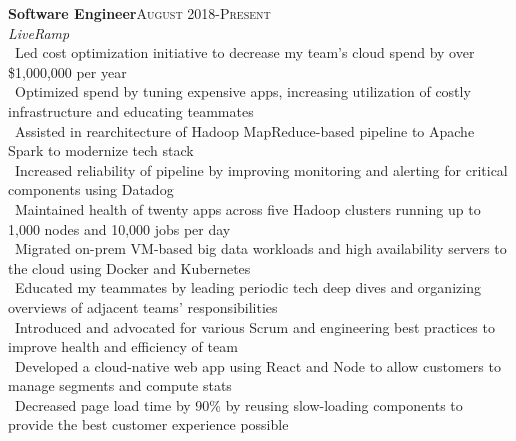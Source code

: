 \documentclass[a4paper,10pt]{article}
\renewcommand{\subsection}[2]{{\noindent \textbf{#1}\hfill \textsc{#2}\\}}
\begin{document}
\subsection{Software Engineer}{August 2018-Present}
\textit{LiveRamp}\\
\textbullet\ Led cost optimization initiative to decrease my team's cloud spend by over \$1,000,000 per year\\
\textbullet\ Optimized spend by tuning expensive apps, increasing utilization of costly infrastructure and educating teammates\\
\textbullet\ Assisted in rearchitecture of Hadoop MapReduce-based pipeline to Apache Spark to modernize tech stack\\
\textbullet\ Increased reliability of pipeline by improving monitoring and alerting for critical components using Datadog\\
\textbullet\ Maintained health of twenty apps across five Hadoop clusters running up to 1,000 nodes and 10,000 jobs per day\\
\textbullet\ Migrated on-prem VM-based big data workloads and high availability servers to the cloud using Docker and Kubernetes\\
\textbullet\ Educated my teammates by leading periodic tech deep dives and organizing overviews of adjacent teams' responsibilities\\
\textbullet\ Introduced and advocated for various Scrum and engineering best practices to improve health and efficiency of team\\
\textbullet\ Developed a cloud-native web app using React and Node to allow customers to manage segments and compute stats\\
\textbullet\ Decreased page load time by 90\% by reusing slow-loading components to provide the best customer experience possible\\
\end{document}
